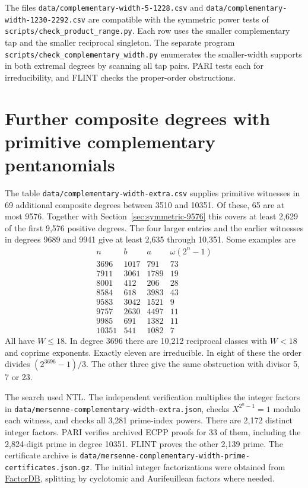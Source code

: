 \documentclass[11pt]{article}
\begin{document}
The files \nolinkurl{data/complementary-width-5-1228.csv} and
\nolinkurl{data/complementary-width-1230-2292.csv} are compatible
with the symmetric power tests of \nolinkurl{scripts/check_product_range.py}.
Each row uses the smaller complementary tap and the smaller reciprocal
singleton. The separate program \nolinkurl{scripts/check_complementary_width.py}
enumerates the smaller-width supports in both extremal degrees by
scanning all tap pairs. PARI tests each for irreducibility, and FLINT
checks the proper-order obstructions.

\section{Further composite degrees with primitive complementary pentanomials}
\label{sec:further-complementary}

The table \nolinkurl{data/complementary-width-extra.csv} supplies
primitive witnesses in 69 additional composite degrees between 3510
and 10351. Of these, 65 are at most 9576. Together with
Section~\ref{sec:symmetric-9576} this covers at least 2,629 of the
first 9,576 positive degrees. The four larger entries and the earlier
witnesses in degrees 9689 and 9941 give at least 2,635 through 10,351.
Some examples are
\[
\begin{array}{r|rr|r}
n&b&a&\omega(2^n-1)\\\hline
3696&1017&791&73\\
7911&3061&1789&19\\
8001&412&206&28\\
8584&618&3983&43\\
9583&3042&1521&9\\
9757&2630&4497&11\\
9985&691&1382&11\\
10351&541&1082&7
\end{array}
\]
All have \(W\le18\). In degree 3696 there are 10,212 reciprocal
classes with \(W<18\) and coprime exponents. Exactly eleven are
irreducible. In eight of these the order divides \((2^{3696}-1)/3\).
The other three give the same obstruction with divisor 5, 7 or 23.

The search used NTL. The independent verification multiplies the
integer factors in \nolinkurl{data/mersenne-complementary-width-extra.json},
checks \(X^{2^n-1}=1\) modulo each witness, and checks all 3,281
prime-index powers. There are 2,172 distinct integer factors.
PARI verifies archived ECPP proofs for 33 of them, including the
2,824-digit prime in degree 10351. FLINT proves the other 2,139 prime.
The certificate archive is
\nolinkurl{data/mersenne-complementary-width-prime-certificates.json.gz}.
The initial integer factorizations were obtained from
\href{https://factordb.com/}{FactorDB}, splitting by cyclotomic
and Aurifeuillean factors where needed.
\end{document}
